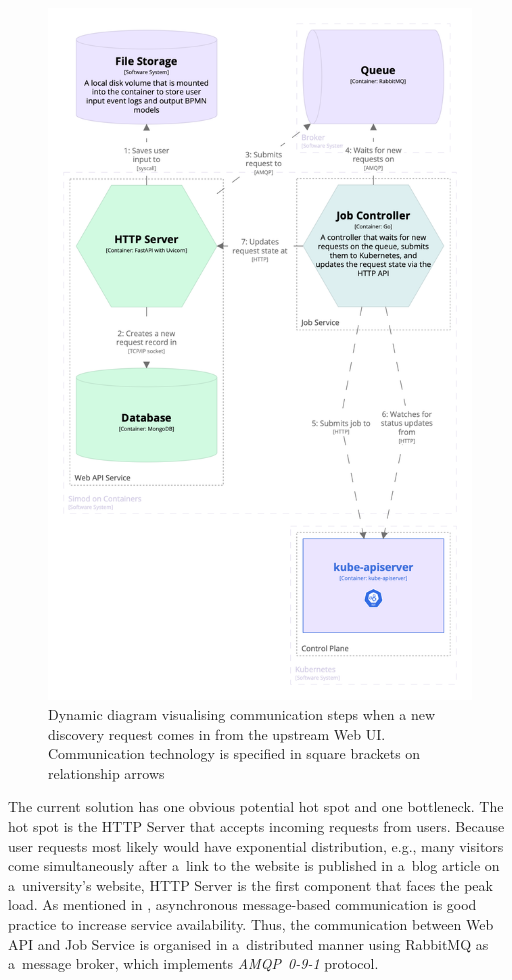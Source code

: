 \documentclass[12pt]{article}
\begin{document}
\begin{figure}[p]
    \centering
    \includegraphics[height=0.9\textheight]{figures/structurizr-1-HttpNewRequest-4.png}
    \caption{Dynamic diagram visualising communication steps when a new discovery request comes in from the upstream Web UI. Communication technology is specified in square brackets on relationship arrows}
    \label{fig:new_request}
\end{figure}

The current solution has one obvious potential hot spot and one bottleneck. The hot spot is the HTTP Server that accepts incoming requests from users. Because user requests most likely would have exponential distribution, e.g., many visitors come simultaneously after a~link to the website is published in a~blog article on a~university's website, HTTP Server is the first component that faces the peak load. As mentioned in , asynchronous message-based communication is good practice to increase service availability. Thus, the communication between Web API and Job Service is organised in a~distributed manner using RabbitMQ as a~message broker, which implements \emph{AMQP~0-9-1} protocol.
\end{document}
